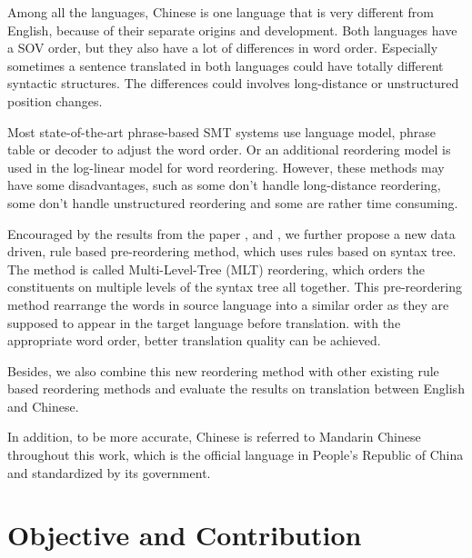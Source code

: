 Among all the languages, Chinese is one language that is very different from English, because of their separate origins and development. Both languages have a SOV order, but they also have a lot of differences in word order. Especially sometimes a sentence translated in both languages could have totally different syntactic structures. The differences could involves long-distance or unstructured position changes.

Most state-of-the-art phrase-based SMT systems use language model, phrase table or decoder to adjust the word order. Or an additional reordering model is used in the log-linear model for word reordering. However, these methods may have some disadvantages, such as some don't handle long-distance reordering, some don't handle unstructured reordering and some are rather time consuming.

Encouraged by the results from the paper \cite{short}, \cite{long} and \cite{tree}, we further propose a new data driven, rule based pre-reordering method, which uses rules based on syntax tree. The method is called Multi-Level-Tree (MLT) reordering, which orders the constituents on multiple levels of the syntax tree all together. This pre-reordering method rearrange the words in source language into a similar order as they are supposed to appear in the target language before translation. with the appropriate word order, better translation quality can be achieved.

Besides, we also combine this new reordering method with other existing rule based reordering methods and evaluate the results on translation between English and Chinese. %


In addition, to be more accurate, Chinese is referred to Mandarin Chinese throughout this work, which is the official language in People's Republic of China and standardized by its government.

\section{Objective and Contribution}
\label{ch:Introduction:sec:ObjectiveAndContribution}

